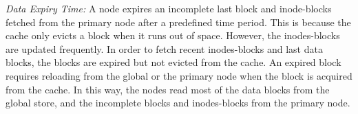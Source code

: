 \documentclass[]{article}
\begin{document}
\textit{Data Expiry Time:} A node expires an incomplete last block and inode-blocks
fetched from the primary node after a predefined time period. 
This is because the cache only evicts a block when it runs out of space. However,
the inodes-blocks are updated frequently. In order to fetch recent inodes-blocks
and last data blocks, the blocks are expired but not evicted from the cache.
An expired block requires reloading from the global or the primary node when
the block is acquired from the cache. In this way, the nodes read most of the
data blocks from the global store, and the incomplete blocks and inodes-blocks
from the primary node.



%






%
%
%
%
%
%






%
%
%
%
%
%
%

\end{document}
